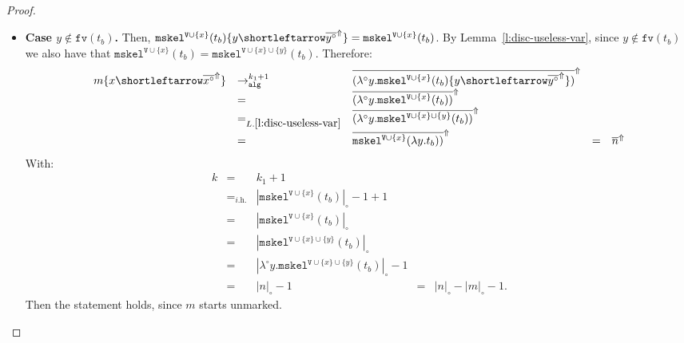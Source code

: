 \documentclass[10pt,a4paper]{article}
\theoremstyle{remark}
\newcommand{\la}[1]{\lambda #1.}
\newcommand{\tm}{t}
\newcommand{\var}{x}
\newcommand{\vartwo}{y}
\newcommand{\Rew}[1]{\rightarrow_{#1}}
\newcommand{\symfont}[1]{\mathtt{#1}}
\newcommand{\isub}[2]{\{#1{\shortleftarrow}#2\}}
\renewcommand{\l}{\lambda}
\newcommand{\ih}{{\textit{i.h.}}\xspace}
\newcommand{\fv}[1]{\symfont{fv}(#1)}
\newcommand{\reflemma}[1]{Lemma~\ref{l:#1}}
\newcommand{\reflemmaeq}[1]{{L.\ref{l:#1}}}
\newcommand{\set}[1]{\{#1\}}
\newcommand{\sizep}[2]{|#1|_{#2}}
\newcommand{\case}[1]{{\bf Case #1.}}
\newcommand{\taken}{\circ}
\newcommand{\lat}[1]{\l^\taken{#1}.}
\newcommand{\frontiersym}{\Uparrow}
\newcommand{\skelu}[1]{\overline{#1}^{\frontiersym}}
\newcommand{\tomark}{\Rew{\symfont{alg}}}
\newcommand{\mtm}{m}
\newcommand{\mtmtwo}{n}
\newcommand{\disc}[2]{\symfont{disc}^{#2}(#1)}
\renewcommand{\disc}[2]{\symfont{mskel}^{#2}(#1)}
\newcommand{\skelvars}{\theta}
\renewcommand{\skelvars}{\symfont{V}}
\newcommand{\sizet}[1]{\sizep{#1}{\taken}}
\begin{document}
\begin{proof}
\begin{itemize}
\begin{itemize}
\item \case{$\vartwo \notin \fv{{\tm_b}}$} Then, $\disc{\tm_b}{\skelvars \cup \{\var\}}\isub\vartwo{\skelu{\vartwo^\taken}} = \disc{\tm_b}{\skelvars \cup \{\var\}}$.
By \reflemma{disc-useless-var}, since $\vartwo \notin \fv{{\tm_b}}$ we also have that $\disc{\tm_b}{\skelvars \cup \{\var\}} = \disc{\tm_b}{\skelvars \cup \{\var\} \cup \{\vartwo\}}$. Therefore:
\[\begin{array}{lllllll}
\mtm\isub\var{\skelu{\var^\taken}}
&\tomark^{k_1 + 1} &
\skelu{(\lat\vartwo\disc{\tm_b}{\skelvars \cup \{\var\}}\isub\vartwo{\skelu{\vartwo^\taken}})} 
\\
&=&
\skelu{(\lat\vartwo\disc{\tm_b}{\skelvars \cup \{\var\}})} 
\\
&=_{\reflemmaeq{disc-useless-var}}&
\skelu{(\lat\vartwo\disc{\tm_b}{\skelvars \cup \{\var\} \cup \{\vartwo\}})} 
\\
&=&
\skelu{\disc{\la\vartwo{\tm_b}}{\skelvars \cup \{\var\}})} 
&= &
\skelu{\mtmtwo}
\end{array}\]
With:
\[\begin{array}{cllllll}
k & = & k_1+1
\\
& =_{\ih} & \sizet{\disc{\tm_b}{\skelvars\cup\set\var}} -1 + 1
\\
& = & \sizet{\disc{\tm_b}{\skelvars\cup\set\var}}
\\
& = & \sizet{\disc{\tm_b}{\skelvars\cup\set\var\cup\set\vartwo}}
\\
& = & 
\sizet{\lat\vartwo\disc{\tm_b}{\skelvars \cup \{\var\} \cup \{\vartwo\}}}  -1
\\
& = & 
\sizet{\mtmtwo} -1
%
& = & 
\sizet{\mtmtwo} - \sizet{\mtm} -1.
\end{array}\]
Then the statement holds, since $\mtm$ starts unmarked.
\end{itemize}




\end{itemize}
\end{proof}
\end{document}

